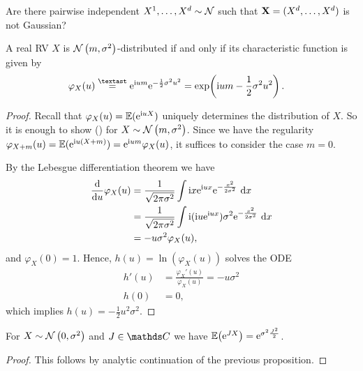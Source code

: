\begin{ex}
	Are there pairwise independent
	\(X^1, \dots, X^d \sim \mathcal{N}\)
	such that \(\mathbf{X} = (X^d, \dots, X^d)\) is not Gaussian?
\end{ex}

\begin{prop}
A real RV $X$ is $\mathcal{N}\left(m,\sigma^2\right)$-distributed if and only if
its characteristic function is given by
\begin{align*}
	\varphi_X(u)
	&\overset\textast= \e^{\i um}\e^{-\frac{1}{2}\sigma^2u^2}
	= \exp\autol(\i um - \frac12\sigma^2u^2\autor).
\qedhere
\end{align*}
\end{prop}

\begin{proof}
Recall that $\varphi_X(u) = \E[norm]{\e^{\i uX}}$ uniquely determines
the distribution of $X$.
So it is enough to show (\textast)
for $X \sim \mathcal{N}\left(m,\sigma^2\right)$.
Since we have the regularity
$\varphi_{X+m}(u) = \E[norm]{\e^{\i u(X+m)}}=\e^{\i um}\varphi_X(u)$,
it suffices to consider the case $m=0$.

By the Lebesgue differentiation theorem we have
\begin{align*}
\frac{\mathrm{d}}{\mathrm{d}u}\varphi_X(u)&=\frac{1}{\sqrt{2\pi \sigma^2}} \int \mathrm{i} x\mathrm{e}^{\mathrm{i} ux}\mathrm{e}^{-\frac{x^2}{2 \sigma^2}}~\mathrm{d}x\\
&=\frac{1}{\sqrt{2 \pi \sigma^2}} \int \mathrm{i} (\mathrm{i} u \mathrm{e}^{\mathrm{i} ux})\sigma^2 \mathrm{e}^{-\frac{x^2}{2 \sigma^2}}~\mathrm{d}x\\
&=-u \sigma^2 \varphi_X(u),
\end{align*}
and $\varphi_X(0)=1$.
Hence, $h(u)=\ln(\varphi_X(u))$ solves the ODE
\begin{align*}
	h'(u) &= \frac{\varphi_X'(u)}{\varphi_X(u)}=-u \sigma^2\\
	h(0)  &= 0,
\end{align*}
which implies $h(u)=-\frac{1}{2}u^2\sigma^2$.
\end{proof}

\begin{cor}
	For $X \sim \mathcal{N}\left(0,\sigma^2\right)$ and $J\in \C$
	we have $\E{\e^{JX}}=\e^{\sigma^2 \frac{J^2}{2}}$.
\end{cor}
\begin{proof}
	This follows by analytic continuation of the previous proposition.
\end{proof}

